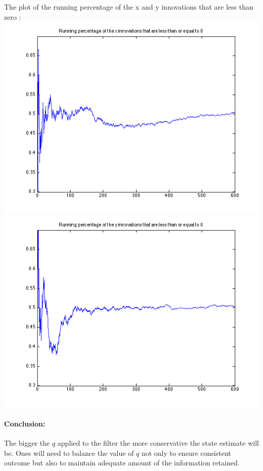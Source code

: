 \documentclass[a4paper]{article}
\begin{document}
The plot of the running percentage of the x and y innovations that are less than zero : \\
\includegraphics[scale=.4]{target_2_x_running_q_1.png}
\includegraphics[scale=.4]{target_2_y_running_q_1.png} \\

\paragraph{Conclusion: } The bigger the $q$ applied to the filter the more conservative the state estimate will be. Ones will need to balance the value of $q$ not only to ensure consistent outcome but also to maintain adequate amount of the information retained. \\
\end{document}
